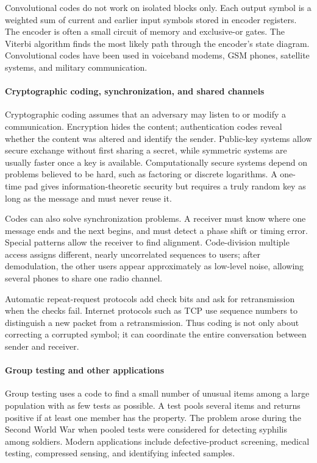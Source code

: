 Convolutional codes do not work on isolated blocks only. Each output symbol is a weighted sum of current and earlier input symbols stored in encoder registers. The encoder is often a small circuit of memory and exclusive-or gates. The Viterbi algorithm finds the most likely path through the encoder's state diagram. Convolutional codes have been used in voiceband modems, GSM phones, satellite systems, and military communication. \cite{coding_theory_ref7}

\paragraph{Cryptographic coding, synchronization, and shared channels}

Cryptographic coding assumes that an adversary may listen to or modify a communication. Encryption hides the content; authentication codes reveal whether the content was altered and identify the sender. Public-key systems allow secure exchange without first sharing a secret, while symmetric systems are usually faster once a key is available. Computationally secure systems depend on problems believed to be hard, such as factoring or discrete logarithms. A one-time pad gives information-theoretic security but requires a truly random key as long as the message and must never reuse it. \cite{coding_theory_ref4}

Codes can also solve synchronization problems. A receiver must know where one message ends and the next begins, and must detect a phase shift or timing error. Special patterns allow the receiver to find alignment. Code-division multiple access assigns different, nearly uncorrelated sequences to users; after demodulation, the other users appear approximately as low-level noise, allowing several phones to share one radio channel.

Automatic repeat-request protocols add check bits and ask for retransmission when the checks fail. Internet protocols such as TCP use sequence numbers to distinguish a new packet from a retransmission. Thus coding is not only about correcting a corrupted symbol; it can coordinate the entire conversation between sender and receiver.

\paragraph{Group testing and other applications}

Group testing uses a code to find a small number of unusual items among a large population with as few tests as possible. A test pools several items and returns positive if at least one member has the property. The problem arose during the Second World War when pooled tests were considered for detecting syphilis among soldiers. Modern applications include defective-product screening, medical testing, compressed sensing, and identifying infected samples.

